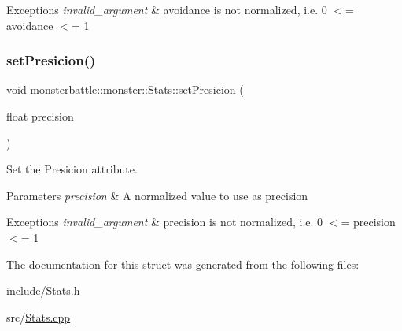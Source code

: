 \begin{DoxyExceptions}{Exceptions}
{\em invalid\+\_\+argument} & avoidance is not normalized, i.\+e. 0 $<$= avoidance $<$= 1 \\
\hline
\end{DoxyExceptions}
\mbox{\label{structmonsterbattle_1_1monster_1_1Stats_aaffb26069cf1f14c7a2b0dd0fbd5a44c}} 
\subsubsection{\texorpdfstring{set\+Presicion()}{setPresicion()}}
{\footnotesize\ttfamily void monsterbattle\+::monster\+::\+Stats\+::set\+Presicion (\begin{DoxyParamCaption}\item[{float}]{precision }\end{DoxyParamCaption})}



Set the Presicion attribute. 


\begin{DoxyParams}{Parameters}
{\em precision} & A normalized value to use as precision\\
\hline
\end{DoxyParams}

\begin{DoxyExceptions}{Exceptions}
{\em invalid\+\_\+argument} & precision is not normalized, i.\+e. 0 $<$= precision $<$= 1 \\
\hline
\end{DoxyExceptions}


The documentation for this struct was generated from the following files\+:\begin{DoxyCompactItemize}
\item 
include/\hyperlink{Stats_8h}{Stats.\+h}\item 
src/\hyperlink{Stats_8cpp}{Stats.\+cpp}\end{DoxyCompactItemize}
